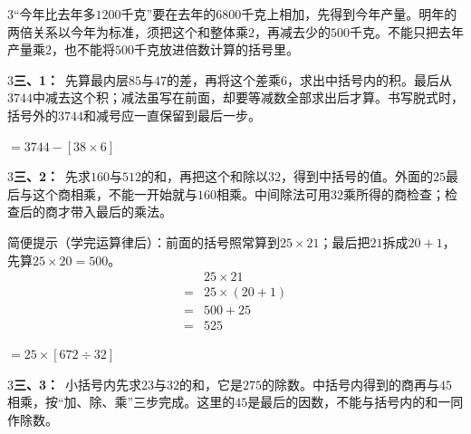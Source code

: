 \documentclass[multi=snippet,border={5bp 20bp 5bp 5bp}]{standalone}
\newenvironment{snippet}[3]{\begin{minipage}{#1bp}\color{answerred}\fontsize{#2}{#3}\selectfont\raggedright}{\end{minipage}}
\begin{document}
\begin{snippet}{505}{11.5}{14}\begin{multicols}{3}\raggedcolumns “今年比去年多\(1200\)\allowbreak 千克”要在去年的\(6800\)\allowbreak 千克上相加，先得到今年产量。明年的两倍关系以今年为标准，须把这个和整体乘\(2\)\allowbreak ，再减去少的\(500\)\allowbreak 千克。不能只把去年产量乘\(2\)\allowbreak ，也不能将\(500\)\allowbreak 千克放进倍数计算的括号里。\end{multicols}\end{snippet}
\begin{snippet}{505}{11.5}{14}\begin{multicols}{3}\raggedcolumns \textbf{三、1：}\ 先算最内层\(85\)\allowbreak 与\(47\)\allowbreak 的差，再将这个差乘\(6\)\allowbreak ，求出中括号内的积。最后从\(3744\)\allowbreak 中减去这个积；减法虽写在前面，却要等减数全部求出后才算。书写脱式时，括号外的\(3744\)\allowbreak 和减号应一直保留到最后一步。\end{multicols}\end{snippet}
\begin{snippet}{79.33829650878907}{10}{12.8}\SourceSans\setlength{\mathindent}{2bp}\(\displaystyle=3744-[38\times6]\)\end{snippet}
\begin{snippet}{505}{11.5}{14}\begin{multicols}{3}\raggedcolumns \textbf{三、2：}\ 先求\(160\)\allowbreak 与\(512\)\allowbreak 的和，再把这个和除以\(32\)\allowbreak ，得到中括号的值。外面的\(25\)\allowbreak 最后与这个商相乘，不能一开始就与\(160\)\allowbreak 相乘。中间除法可用\(32\)\allowbreak 乘所得的商检查；检查后的商才带入最后的乘法。\par 简便提示（学完运算律后）：前面的括号照常算到\(25\times21\)\allowbreak ；最后把\(21\)\allowbreak 拆成\(20+1\)\allowbreak ，先算\(25\times20=500\)\allowbreak 。\[\begin{aligned}&25\times21\\={}&25\times(20+1)\\={}&500+25\\={}&525\end{aligned}\]\end{multicols}\end{snippet}
\begin{snippet}{87.07808837890627}{10}{12.8}\SourceSans\setlength{\mathindent}{2bp}\(\displaystyle=25\times[672\div32]\)\end{snippet}
\begin{snippet}{505}{11.5}{14}\begin{multicols}{3}\raggedcolumns \textbf{三、3：}\ 小括号内先求\(23\)\allowbreak 与\(32\)\allowbreak 的和，它是\(275\)\allowbreak 的除数。中括号内得到的商再与\(45\)\allowbreak 相乘，按“加、除、乘”三步完成。这里的\(45\)\allowbreak 是最后的因数，不能与括号内的和一同作除数。\end{multicols}\end{snippet}
\end{document}

